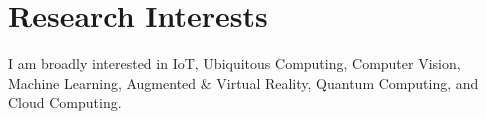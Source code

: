 
\section{\sc Research Interests}

I am broadly interested in IoT, Ubiquitous Computing, Computer Vision, Machine Learning, Augmented \& Virtual Reality, Quantum Computing, and Cloud Computing.




